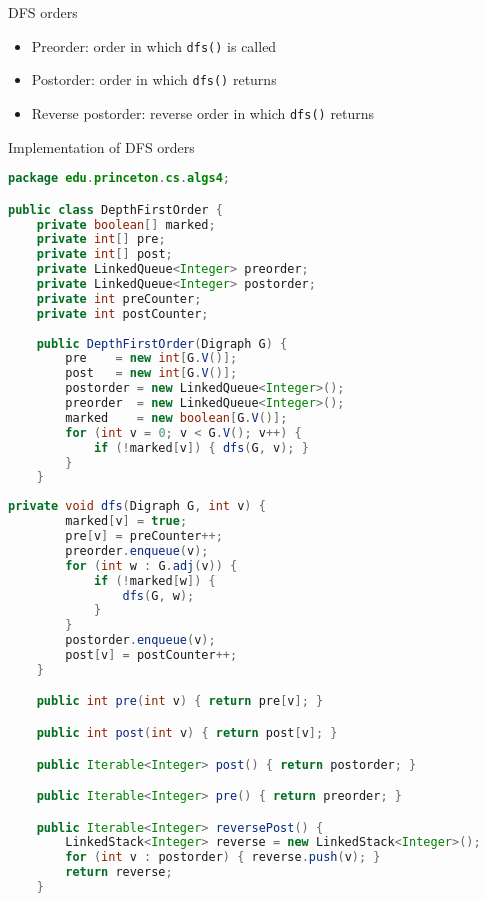 \documentclass[8pt,a4paper,compress]{beamer}
\begin{document}
\begin{frame}[fragile]
\pause

DFS orders
\begin{itemize}
\item Preorder: order in which \lstinline{dfs()} is called

\item Postorder: order in which \lstinline{dfs()} returns

\item Reverse postorder: reverse order in which \lstinline{dfs()} returns
\end{itemize}

\pause
\bigskip

Implementation of DFS orders
\begin{lstlisting}[language=java,style=focusin]
package edu.princeton.cs.algs4;

public class DepthFirstOrder {
    private boolean[] marked;          
    private int[] pre; 
    private int[] post; 
    private LinkedQueue<Integer> preorder; 
    private LinkedQueue<Integer> postorder; 
    private int preCounter; 
    private int postCounter; 
    
    public DepthFirstOrder(Digraph G) {
        pre    = new int[G.V()];
        post   = new int[G.V()];
        postorder = new LinkedQueue<Integer>();
        preorder  = new LinkedQueue<Integer>();
        marked    = new boolean[G.V()];
        for (int v = 0; v < G.V(); v++) { 
            if (!marked[v]) { dfs(G, v); }
        }
    }
\end{lstlisting}
\end{frame}

\begin{frame}[fragile]
\pause

\begin{lstlisting}[language=java,style=focusin]    
    private void dfs(Digraph G, int v) {
        marked[v] = true;
        pre[v] = preCounter++;
        preorder.enqueue(v);
        for (int w : G.adj(v)) {
            if (!marked[w]) { 
                dfs(G, w); 
            }
        }
        postorder.enqueue(v);
        post[v] = postCounter++;
    }

    public int pre(int v) { return pre[v]; }

    public int post(int v) { return post[v]; }

    public Iterable<Integer> post() { return postorder; }

    public Iterable<Integer> pre() { return preorder; }

    public Iterable<Integer> reversePost() {
        LinkedStack<Integer> reverse = new LinkedStack<Integer>();
        for (int v : postorder) { reverse.push(v); }
        return reverse;
    }
\end{lstlisting}
\end{frame}
\end{document}
